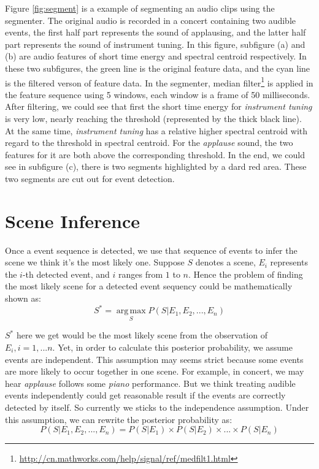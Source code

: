 Figure \ref{fig:segment} is a example of segmenting an audio clips using the segmenter. 
The original audio is recorded in a concert containing two audible events, the first half part represents the sound of applausing, and the latter half part represents the sound of instrument tuning. 
In this figure, subfigure (a) and (b) are audio features of short time energy and spectral centroid respectively.  
In these two subfigures, the green line is the original feature data, and the cyan line is the filtered verson of feature data. 
In the segmenter, median filter\footnote{\url{http://cn.mathworks.com/help/signal/ref/medfilt1.html}} is applied in the feature sequence using 5 windows, each window is a frame of 50 milliseconds. 
After filtering, we could see that first the short time energy for \textit{instrument tuning} is very low, nearly reaching the threshold (represented by the thick black line). 
At the same time, \textit{instrument tuning} has a relative higher spectral centroid with regard to the threshold in spectral centroid. 
For the \textit{applause} sound, the two features for it are both above the corresponding threshold.  
In the end, we could see in subfigure (c), there is two segments highlighted by a dard red area. 
These two segments are cut out for event detection. 

\section{Scene Inference}
Once a event sequence is detected, we use that sequence of events to infer the scene we think it's the most likely one. 
Suppose $S$ denotes a scene, $E_i$ represents the $i$-th detected event, and $i$ ranges from $1$ to $n$. 
Hence the problem of finding the most likely scene for a detected event sequency could be mathematically shown as: 
\begin{equation}
S^* = \operatorname*{arg\,max}_{S} P(S|E_1,E_2,...,E_n)
\end{equation} 

$S^*$ here we get would be the most likely scene from the observation of $E_i, i = 1,...n$.  
Yet, in order to calculate this posterior probability, we assume events are independent. 
This assumption may seems strict because some events are more likely to occur together in one scene. 
For example, in concert, we may hear \textit{applause} follows some \textit{piano} performance. 
But we think treating audible events independently could get reasonable result if the events are correctly detected by itself. 
So currently we sticks to the independence assumption. 
Under this assumption, we can rewrite the posterior probability as: 
\begin{equation}
P(S|E_1,E_2,...,E_n) = P(S|E_1) \times P(S|E_2) \times ... \times P(S|E_n)
\end{equation}

